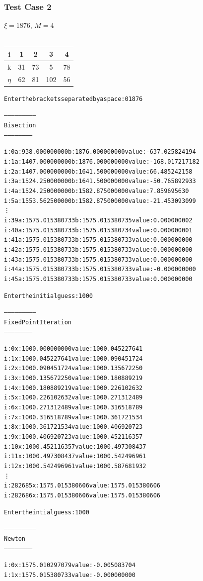 \documentclass[11pt]{article} %
\begin{document}
\subsubsection*{Test Case 2}
$\xi = 1876$, $M = 4$ \\ \\
\begin{tabular}{||c||c c c c|}
\hline
i & 1 & 2 & 3 & 4 \\
\hline
k & 31 & 73 & 5 & 78 \\
\hline
$\eta$ & 62 & 81 & 102 & 56 \\
\hline
\end{tabular}

\begin{alltt}
Enter the brackets separated by a space: 0 1876

--------------------------
 Bisection
 -----------------------


i: 0	a: 938.000000000	b: 1876.000000000	value: -637.025824194 
i: 1	a: 1407.000000000	b: 1876.000000000	value: -168.017217182 
i: 2	a: 1407.000000000	b: 1641.500000000	value: 66.485242158 
i: 3	a: 1524.250000000	b: 1641.500000000	value: -50.765892933 
i: 4	a: 1524.250000000	b: 1582.875000000	value: 7.859695630 
i: 5	a: 1553.562500000	b: 1582.875000000	value: -21.453093099 
\vdots
i: 39	a: 1575.015380733	b: 1575.015380735	value: 0.000000002 
i: 40	a: 1575.015380733	b: 1575.015380734	value: 0.000000001 
i: 41	a: 1575.015380733	b: 1575.015380733	value: 0.000000000 
i: 42	a: 1575.015380733	b: 1575.015380733	value: 0.000000000 
i: 43	a: 1575.015380733	b: 1575.015380733	value: 0.000000000 
i: 44	a: 1575.015380733	b: 1575.015380733	value: -0.000000000 
i: 45	a: 1575.015380733	b: 1575.015380733	value: 0.000000000 

Enter the initial guess: 1000

--------------------------
 Fixed Point Iteration
 -----------------------


i: 0	x: 1000.000000000	value: 1000.045227641
i: 1	x: 1000.045227641	value: 1000.090451724
i: 2	x: 1000.090451724	value: 1000.135672250
i: 3	x: 1000.135672250	value: 1000.180889219
i: 4	x: 1000.180889219	value: 1000.226102632
i: 5	x: 1000.226102632	value: 1000.271312489
i: 6	x: 1000.271312489	value: 1000.316518789
i: 7	x: 1000.316518789	value: 1000.361721534
i: 8	x: 1000.361721534	value: 1000.406920723
i: 9	x: 1000.406920723	value: 1000.452116357
i: 10	x: 1000.452116357	value: 1000.497308437
i: 11	x: 1000.497308437	value: 1000.542496961
i: 12	x: 1000.542496961	value: 1000.587681932
\vdots
i: 282685	x: 1575.015380606	value: 1575.015380606
i: 282686	x: 1575.015380606	value: 1575.015380606


Enter the intial guess: 1000

--------------------------
 Newton
 -----------------------


i: 0	x: 1575.010297079	value: -0.005083704
i: 1	x: 1575.015380733	value: -0.000000000
\end{alltt}
\end{document}
